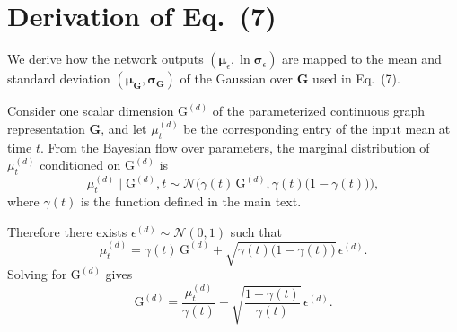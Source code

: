 \documentclass[journal,twoside,web]{ieeecolor}
\begin{document}

\onecolumn

\section{Derivation of Eq.~(7)}
\label{app:eq7:derivation}

We derive how the network outputs $(\boldsymbol{\mu}_\epsilon, \ln\boldsymbol{\sigma}_\epsilon)$ are mapped to the mean and standard deviation $(\boldsymbol{\mu}_\mathbf{G}, \boldsymbol{\sigma}_\mathbf{G})$ of the Gaussian over $\mathbf{G}$ used in Eq.~(7).

Consider one scalar dimension $\mathrm{G}^{(d)}$ of the parameterized continuous graph representation $\mathbf{G}$, and let $\mu_t^{(d)}$ be the corresponding entry of the input mean at time $t$.
From the Bayesian flow over parameters, the marginal distribution of $\mu_t^{(d)}$ conditioned on $\mathrm{G}^{(d)}$ is
\begin{equation}
    \mu_t^{(d)} \mid \mathrm{G}^{(d)}, t
    \sim
    \mathcal{N}\!\big(
        \gamma(t)\,\mathrm{G}^{(d)},
        \gamma(t)\bigl(1-\gamma(t)\bigr)
    \big),
\end{equation}
where $\gamma(t)$ is the function defined in the main text.

Therefore there exists $\epsilon^{(d)} \sim \mathcal{N}(0,1)$ such that
\begin{equation}
    \mu_t^{(d)}
    =
    \gamma(t)\,\mathrm{G}^{(d)}
    +
    \sqrt{\gamma(t)\bigl(1-\gamma(t)\bigr)}\,
    \epsilon^{(d)}.
\end{equation}
Solving for $\mathrm{G}^{(d)}$ gives
\begin{equation}
    \mathrm{G}^{(d)}
    =
    \frac{\mu_t^{(d)}}{\gamma(t)}
    -
    \sqrt{\frac{1-\gamma(t)}{\gamma(t)}}\,
    \epsilon^{(d)}.
    \label{eq:app-G-from-eps}
\end{equation}
\end{document}
